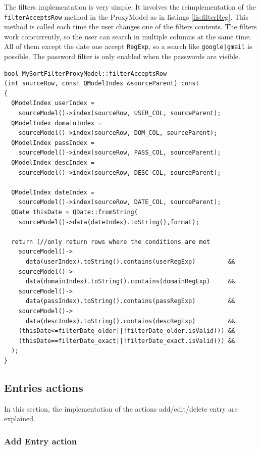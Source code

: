 The filters implementation is very simple. It involves the reimplementation of the \texttt{filterAcceptsRow} method in the ProxyModel as in listings \ref{lis:filterReg}. This method  is called each time the user changes one of the filters contents. The filters work concurrently, so the user can search in multiple columns at the same time. All of them except the date one accept \texttt{RegExp}, so a search like \texttt{google|gmail} is possible. The password filter is only enabled when the passwords are visible.


\begin{lstlisting}[style=customc, float=htb, caption={Filters implementation}, label = {lis:filterReg}]
bool MySortFilterProxyModel::filterAcceptsRow
(int sourceRow, const QModelIndex &sourceParent) const
{
  QModelIndex userIndex = 
    sourceModel()->index(sourceRow, USER_COL, sourceParent);
  QModelIndex domainIndex = 
    sourceModel()->index(sourceRow, DOM_COL, sourceParent);
  QModelIndex passIndex = 
    sourceModel()->index(sourceRow, PASS_COL, sourceParent);
  QModelIndex descIndex = 
    sourceModel()->index(sourceRow, DESC_COL, sourceParent);

  QModelIndex dateIndex = 
    sourceModel()->index(sourceRow, DATE_COL, sourceParent);
  QDate thisDate = QDate::fromString(
    sourceModel()->data(dateIndex).toString(),format);

  return (//only return rows where the conditions are met    
    sourceModel()->
      data(userIndex).toString().contains(userRegExp)         && 
    sourceModel()->
      data(domainIndex).toString().contains(domainRegExp)     && 
    sourceModel()->
      data(passIndex).toString().contains(passRegExp)         &&
    sourceModel()->
      data(descIndex).toString().contains(descRegExp)         &&
    (thisDate<=filterDate_older||!filterDate_older.isValid()) &&
    (thisDate==filterDate_exact||!filterDate_exact.isValid()) &&
  );
}
\end{lstlisting}

\subsection{Entries actions}

In this section, the implementation of the actions add/edit/delete entry are explained.

\subsubsection*{Add Entry action}

